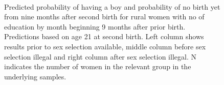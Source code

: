 \documentclass[12pt,letterpaper]{article}
\begin{document}
\begin{figure}[htpb]
{\begin{minipage}{0.31\textwidth}
        \captionsetup[subfigure]{labelformat=empty,position=top,captionskip=-1pt,farskip=-0.5pt}
        \\
        \captionsetup[subfigure]{labelformat=parens}
    \end{minipage}
}
\setcounter{subfigure}{3}
\caption{Predicted probability of having a boy and probability of
no birth yet from nine months after second birth for rural
women with no of education by month beginning 9 months after prior birth. 
Predictions based on age 21 at second birth.
Left column shows results prior to sex selection available, middle column before
sex selection illegal and right column after sex selection illegal.
N indicates the number of women in the relevant group in the underlying samples.
}
\label{fig:results_spell4_low_rural}
\end{figure}
\end{document}

